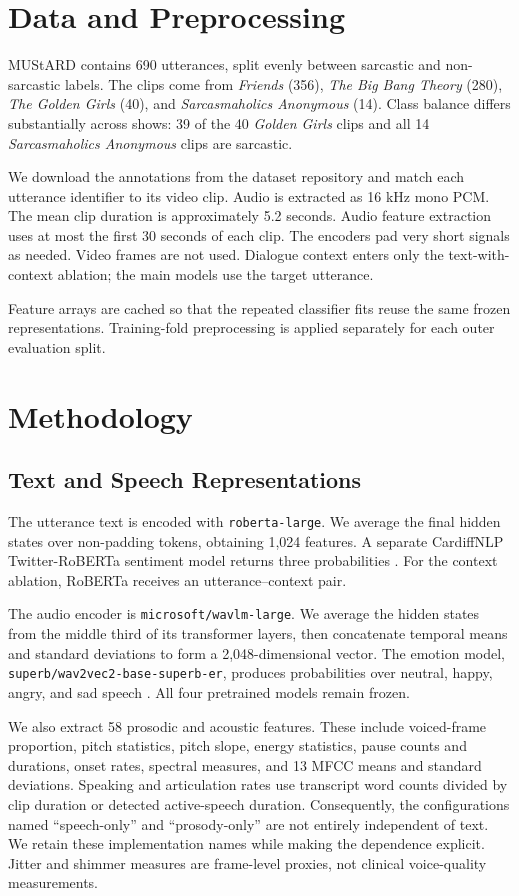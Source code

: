\documentclass[conference]{IEEEtran}
\begin{document}
\section{Data and Preprocessing}
MUStARD contains 690 utterances, split evenly between sarcastic and non-sarcastic labels. The clips come from \emph{Friends} (356), \emph{The Big Bang Theory} (280), \emph{The Golden Girls} (40), and \emph{Sarcasmaholics Anonymous} (14). Class balance differs substantially across shows: 39 of the 40 \emph{Golden Girls} clips and all 14 \emph{Sarcasmaholics Anonymous} clips are sarcastic.

We download the annotations from the dataset repository and match each utterance identifier to its video clip. Audio is extracted as 16 kHz mono PCM. The mean clip duration is approximately 5.2 seconds. Audio feature extraction uses at most the first 30 seconds of each clip. The encoders pad very short signals as needed. Video frames are not used. Dialogue context enters only the text-with-context ablation; the main models use the target utterance.

Feature arrays are cached so that the repeated classifier fits reuse the same frozen representations. Training-fold preprocessing is applied separately for each outer evaluation split.

\section{Methodology}
\subsection{Text and Speech Representations}
The utterance text is encoded with \texttt{roberta-large}. We average the final hidden states over non-padding tokens, obtaining 1,024 features. A separate CardiffNLP Twitter-RoBERTa sentiment model returns three probabilities \cite{cardiff}. For the context ablation, RoBERTa receives an utterance--context pair.

The audio encoder is \texttt{microsoft/wavlm-large}. We average the hidden states from the middle third of its transformer layers, then concatenate temporal means and standard deviations to form a 2,048-dimensional vector. The emotion model, \texttt{superb/wav2vec2-base-superb-er}, produces probabilities over neutral, happy, angry, and sad speech \cite{superber}. All four pretrained models remain frozen.

We also extract 58 prosodic and acoustic features. These include voiced-frame proportion, pitch statistics, pitch slope, energy statistics, pause counts and durations, onset rates, spectral measures, and 13 MFCC means and standard deviations. Speaking and articulation rates use transcript word counts divided by clip duration or detected active-speech duration. Consequently, the configurations named ``speech-only'' and ``prosody-only'' are not entirely independent of text. We retain these implementation names while making the dependence explicit. Jitter and shimmer measures are frame-level proxies, not clinical voice-quality measurements.
\end{document}
